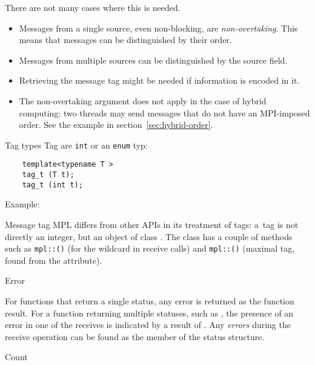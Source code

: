 There are not many cases where this is needed.
\begin{itemize}
\item Messages from a single source, even non-blocking,
  are \emph{non-overtaking}.
  This means that messages can be distinguished by their order.
\item Messages from multiple sources can be distinguished by the source field.
\item Retrieving the message tag might be needed if information is encoded in it.
\item The non-overtaking argument does not apply in the case of hybrid
  computing: two threads may send messages that do not have an MPI-imposed order.
  See the example in section~\ref{sec:hybrid-order}.
\end{itemize}

\begin{mplnote}{Tag types}
  Tag are \lstinline{int} or an \lstinline{enum} typ:
  \begin{lstlisting}
    template<typename T >
 	tag_t (T t);
 	tag_t (int t);
  \end{lstlisting}
  Example:
\end{mplnote}

\begin{mplnote}{Message tag}
  \ac{MPL} differs from other \acp{API} in its treatment of tags:
  a~tag is not directly an integer, but an object of class .
  The  class has a couple of methods such as
  \lstinline+mpl::+\lstinline+()+
  (for the  wildcard in receive calls)
  and
  \lstinline+mpl::+\lstinline+()+
  (maximal tag, found from the  attribute).
\end{mplnote}

 {Error}
\label{sec:mpi-status-error}

For functions that return a single status, any error is returned
as the function result.
For a function returning multiple statuses,
such as ,
the presence of an error in one of the receives
is indicated by a result of .
Any \emph{errors}
during the receive operation can be found as the
member of the status structure.


 {Count}
\label{sec:mpi-status-count}

